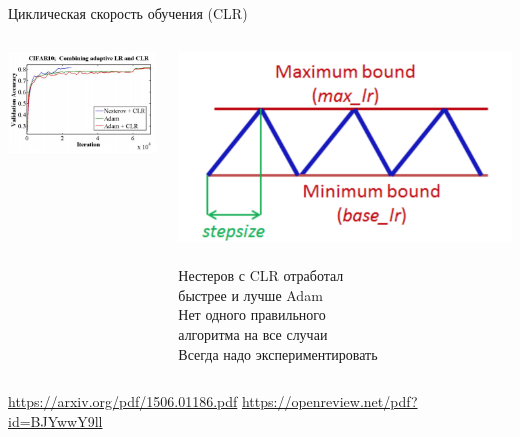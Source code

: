 \documentclass[notes,12pt, aspectratio=169]{beamer}
\begin{document}
\begin{frame}{Циклическая скорость обучения (CLR)}
	\begin{columns}[T] %
		\begin{column}{.48\textwidth}
			\centering \includegraphics[scale=0.55]{cycle_2.png}
		\end{column}%
		\hfill%
		\begin{column}{.48\textwidth}
			\centering \includegraphics[scale=0.17]{cycle.png} \\ \mbox{ } \\
			Нестеров с CLR отработал \\ быстрее и лучше Adam \\ \alert{Нет одного правильного \\ алгоритма на все случаи}  \\ Всегда надо экспериментировать
		\end{column}%
	\end{columns}
	
	\vfill %
	\footnotesize  
	\color{blue} \url{https://arxiv.org/pdf/1506.01186.pdf} \newline  \url{https://openreview.net/pdf?id=BJYwwY9ll}
\end{frame}
\end{document}
